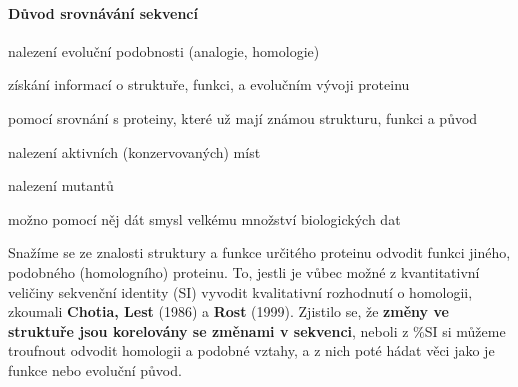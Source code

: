 \documentclass[DIV=8]{scrreprt}
\begin{document}
\paragraph{Důvod srovnávání sekvencí}
\begin{myItemize}[nosep]
    \item nalezení evoluční podobnosti (analogie, homologie)
    \item získání informací o struktuře, funkci, a evolučním vývoji proteinu
\begin{myItemize}[nosep]
    \item pomocí srovnání s proteiny, které už mají známou strukturu, funkci a původ
\end{myItemize}

    \item nalezení aktivních (konzervovaných) míst
    \item nalezení mutantů
    \item možno pomocí něj dát smysl velkému množství biologických dat
\end{myItemize}



Snažíme se ze znalosti struktury a funkce určitého proteinu odvodit funkci jiného, podobného (homologního) proteinu. To, jestli je vůbec možné z kvantitativní veličiny sekvenční identity (SI) vyvodit kvalitativní rozhodnutí o homologii, zkoumali \textbf{Chotia, Lest} (1986) a \textbf{Rost} (1999). Zjistilo se, že \textbf{změny ve struktuře jsou korelovány se změnami v sekvenci}, neboli z \%SI si můžeme troufnout odvodit homologii a podobné vztahy, a z nich poté hádat věci jako je funkce nebo evoluční původ.
\end{document}
